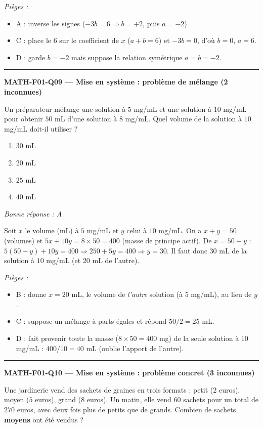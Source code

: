 \documentclass[11pt,a4paper]{article}
\begin{document}
\textit{Pièges :}
\begin{itemize}
\item A : inverse les signes ($-3b=6\Rightarrow b=+2$, puis $a=-2$).
\item C : place le $6$ sur le coefficient de $x$ ($a+b=6$) et $-3b=0$, d'o\`u $b=0$, $a=6$.
\item D : garde $b=-2$ mais suppose la relation sym\'etrique $a=b=-2$.
\end{itemize}
\vspace{8pt}\hrule\vspace{8pt}
\noindent\textbf{MATH-F01-Q09 --- Mise en système : problème de mélange (2 inconnues)}\par
Un pr\'eparateur m\'elange une solution \`a $5$ mg/mL et une solution \`a $10$ mg/mL pour obtenir $50$ mL d'une solution \`a $8$ mg/mL. Quel volume de la solution \`a $10$ mg/mL doit-il utiliser ?
\begin{enumerate}[label=\Alph*)]
\item $30$ mL
\item $20$ mL
\item $25$ mL
\item $40$ mL
\end{enumerate}
\textit{Bonne réponse : A}\par
Soit $x$ le volume (mL) \`a $5$ mg/mL et $y$ celui \`a $10$ mg/mL. On a $x+y=50$ (volumes) et $5x+10y=8\times 50=400$ (masse de principe actif). De $x=50-y$ : $5(50-y)+10y=400\Rightarrow 250+5y=400\Rightarrow y=30$. Il faut donc $30$ mL de la solution \`a $10$ mg/mL (et $20$ mL de l'autre).\par
\textit{Pièges :}
\begin{itemize}
\item B : donne $x=20$ mL, le volume de \emph{l'autre} solution (\`a $5$ mg/mL), au lieu de $y$.
\item C : suppose un m\'elange \`a parts \'egales et r\'epond $50/2=25$ mL.
\item D : fait provenir toute la masse ($8\times 50=400$ mg) de la seule solution \`a $10$ mg/mL : $400/10=40$ mL (oublie l'apport de l'autre).
\end{itemize}
\vspace{8pt}\hrule\vspace{8pt}
\noindent\textbf{MATH-F01-Q10 --- Mise en système : problème concret (3 inconnues)}\par
Une jardinerie vend des sachets de graines en trois formats : petit ($2$ euros), moyen ($5$ euros), grand ($8$ euros). Un matin, elle vend $60$ sachets pour un total de $270$ euros, avec deux fois plus de petits que de grands. Combien de sachets \textbf{moyens} ont \'et\'e vendus ?
\end{document}
